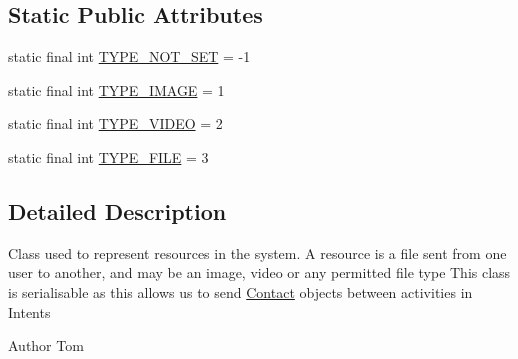 \subsection*{Static Public Attributes}
\begin{DoxyCompactItemize}
\item 
static final int \hyperlink{classcom_1_1lbros_1_1epicchat_1_1_resource_a2129c157c8f5f38bc70555dfb4037502}{T\-Y\-P\-E\-\_\-\-N\-O\-T\-\_\-\-S\-E\-T} = -\/1
\item 
static final int \hyperlink{classcom_1_1lbros_1_1epicchat_1_1_resource_a33e666a895cedd2039d9d780bd44aded}{T\-Y\-P\-E\-\_\-\-I\-M\-A\-G\-E} = 1
\item 
static final int \hyperlink{classcom_1_1lbros_1_1epicchat_1_1_resource_addfd165d7ba653dab61af55ce76f112c}{T\-Y\-P\-E\-\_\-\-V\-I\-D\-E\-O} = 2
\item 
static final int \hyperlink{classcom_1_1lbros_1_1epicchat_1_1_resource_a3856fb8009d3a6b0bc6202b207f98129}{T\-Y\-P\-E\-\_\-\-F\-I\-L\-E} = 3
\end{DoxyCompactItemize}


\subsection{Detailed Description}
Class used to represent resources in the system. A resource is a file sent from one user to another, and may be an image, video or any permitted file type This class is serialisable as this allows us to send \hyperlink{classcom_1_1lbros_1_1epicchat_1_1_contact}{Contact} objects between activities in Intents \begin{DoxyAuthor}{Author}
Tom 
\end{DoxyAuthor}


